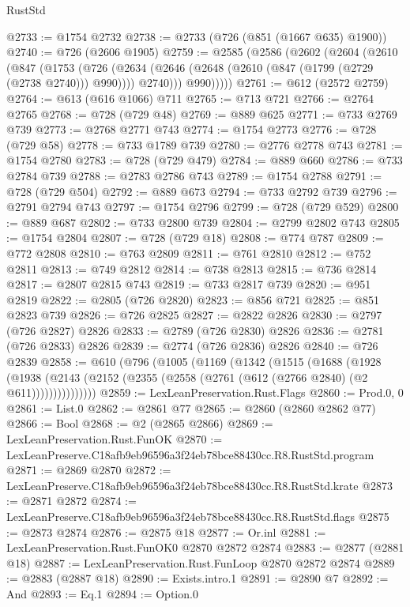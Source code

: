 \begin{lexlean}{RustStd}
\begin{coremodule}
@2733 := @1754 @2732
@2738 := @2733 (@726 (@851 (@1667 @635) @1900))
@2740 := @726 (@2606 @1905)
@2759 := @2585
    (@2586
      (@2602
        (@2604
          (@2610
            (@847
              (@1753
                (@726
                  (@2634 (@2646 (@2648 (@2610 (@847 (@1799 (@2729 (@2738 @2740))) @990)))) @2740)))
              @990)))))
@2761 := @612 (@2572 @2759)
@2764 := @613 (@616 @1066) @711
@2765 := @713 @721
@2766 := @2764 @2765
@2768 := @728 (@729 @48)
@2769 := @889 @625
@2771 := @733 @2769 @739
@2773 := @2768 @2771 @743
@2774 := @1754 @2773
@2776 := @728 (@729 @58)
@2778 := @733 @1789 @739
@2780 := @2776 @2778 @743
@2781 := @1754 @2780
@2783 := @728 (@729 @479)
@2784 := @889 @660
@2786 := @733 @2784 @739
@2788 := @2783 @2786 @743
@2789 := @1754 @2788
@2791 := @728 (@729 @504)
@2792 := @889 @673
@2794 := @733 @2792 @739
@2796 := @2791 @2794 @743
@2797 := @1754 @2796
@2799 := @728 (@729 @529)
@2800 := @889 @687
@2802 := @733 @2800 @739
@2804 := @2799 @2802 @743
@2805 := @1754 @2804
@2807 := @728 (@729 @18)
@2808 := @774 @787
@2809 := @772 @2808
@2810 := @763 @2809
@2811 := @761 @2810
@2812 := @752 @2811
@2813 := @749 @2812
@2814 := @738 @2813
@2815 := @736 @2814
@2817 := @2807 @2815 @743
@2819 := @733 @2817 @739
@2820 := @951 @2819
@2822 := @2805 (@726 @2820)
@2823 := @856 @721
@2825 := @851 @2823 @739
@2826 := @726 @2825
@2827 := @2822 @2826
@2830 := @2797 (@726 @2827) @2826
@2833 := @2789 (@726 @2830) @2826
@2836 := @2781 (@726 @2833) @2826
@2839 := @2774 (@726 @2836) @2826
@2840 := @726 @2839
@2858 := @610
    (@796
      (@1005
        (@1169
          (@1342
            (@1515
              (@1688
                (@1928
                  (@1938
                    (@2143 (@2152 (@2355 (@2558 (@2761 (@612 (@2766 @2840) (@2 @611)))))))))))))))
@2859 := LexLeanPreservation.Rust.Flags
@2860 := Prod.{0, 0}
@2861 := List.{0}
@2862 := @2861 @77
@2865 := @2860 (@2860 @2862 @77)
@2866 := Bool
@2868 := @2 (@2865 @2866)
@2869 := LexLeanPreservation.Rust.FunOK
@2870 := LexLeanPreserve.C18afb9eb96596a3f24eb78bce88430cc.R8.RustStd.program
@2871 := @2869 @2870
@2872 := LexLeanPreserve.C18afb9eb96596a3f24eb78bce88430cc.R8.RustStd.krate
@2873 := @2871 @2872
@2874 := LexLeanPreserve.C18afb9eb96596a3f24eb78bce88430cc.R8.RustStd.flags
@2875 := @2873 @2874
@2876 := @2875 @18
@2877 := Or.inl
@2881 := LexLeanPreservation.Rust.FunOK0 @2870 @2872 @2874
@2883 := @2877 (@2881 @18)
@2887 := LexLeanPreservation.Rust.FunLoop @2870 @2872 @2874
@2889 := @2883 (@2887 @18)
@2890 := Exists.intro.{1}
@2891 := @2890 @7
@2892 := And
@2893 := Eq.{1}
@2894 := Option.{0}

\end{coremodule}
\end{lexlean}
